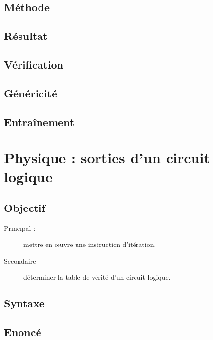 \subsection{Méthode}\label{boucles:maths:methode}

\subsection{Résultat}\label{boucles:maths:resultat}

\subsection{Vérification}\label{boucles:maths:verification}

\subsection{Généricité}\label{boucles:maths:genericite}

\subsection{Entraînement}\label{boucles:maths:entrainement}

\section{Physique : sorties d'un circuit logique}\label{boucles:physique}

\subsection{Objectif}\label{boucles:physique:objectif}
\begin{description}
\item[Principal : ] mettre en \oe uvre une instruction d'itération.
\item[Secondaire :] déterminer la table de vérité d'un circuit logique.
\end{description}

\subsection{Syntaxe \python}\label{boucles:physique:python}

\subsection{Enoncé}\label{boucles:physique:enonce}

